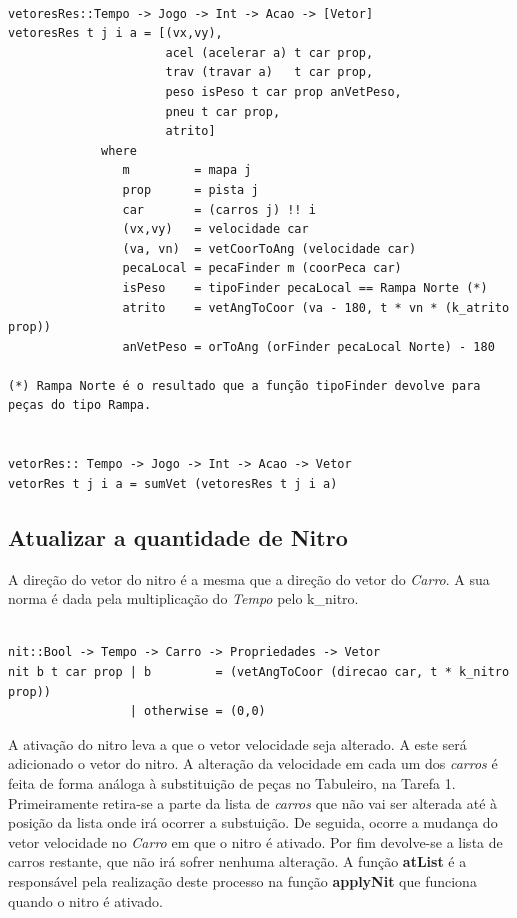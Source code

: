 \documentclass[a4paper]{report} %
\begin{document}
\begin{verbatim}

vetoresRes::Tempo -> Jogo -> Int -> Acao -> [Vetor]
vetoresRes t j i a = [(vx,vy),
                      acel (acelerar a) t car prop,
                      trav (travar a)   t car prop,
                      peso isPeso t car prop anVetPeso,
                      pneu t car prop,
                      atrito]
             where
                m         = mapa j
                prop      = pista j
                car       = (carros j) !! i
                (vx,vy)   = velocidade car
                (va, vn)  = vetCoorToAng (velocidade car)
                pecaLocal = pecaFinder m (coorPeca car)
                isPeso    = tipoFinder pecaLocal == Rampa Norte (*)
                atrito    = vetAngToCoor (va - 180, t * vn * (k_atrito prop))
                anVetPeso = orToAng (orFinder pecaLocal Norte) - 180

(*) Rampa Norte é o resultado que a função tipoFinder devolve para peças do tipo Rampa.


vetorRes:: Tempo -> Jogo -> Int -> Acao -> Vetor
vetorRes t j i a = sumVet (vetoresRes t j i a)

\end{verbatim}

\subsection{Atualizar a quantidade de Nitro}

A direção do vetor do nitro é a mesma que a direção do vetor do \emph{Carro}. A sua norma é dada pela multiplicação do \emph{Tempo} pelo k_nitro.

\begin{verbatim}

nit::Bool -> Tempo -> Carro -> Propriedades -> Vetor
nit b t car prop | b         = (vetAngToCoor (direcao car, t * k_nitro prop))
                 | otherwise = (0,0)

\end{verbatim}

A ativação do nitro leva a que o vetor velocidade seja alterado. A este será adicionado o vetor do nitro. A alteração da velocidade em cada um dos \emph{carros} é feita de forma análoga à substituição de peças no Tabuleiro, na Tarefa 1. Primeiramente retira-se a parte da lista de \emph{carros} que não vai ser alterada até à posição da lista onde irá ocorrer a substuição. De seguida, ocorre a mudança do vetor velocidade no \emph{Carro} em que o nitro é ativado. Por fim devolve-se a lista de carros restante, que não irá sofrer nenhuma alteração. A função \textbf{atList} é a responsável pela realização deste processo na função \textbf{applyNit} que funciona quando o nitro é ativado.
\end{document}
